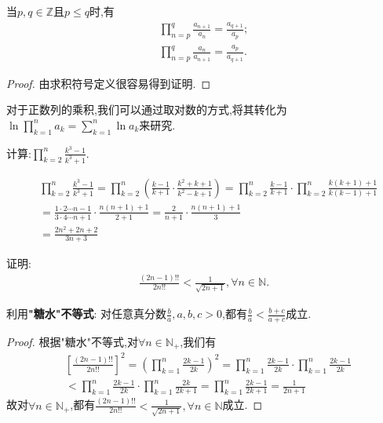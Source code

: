 \documentclass[lang=cn,newtx,10pt,scheme=chinese]{elegantbook}
\begin{document}
\begin{theorem}[基本结论]\label{theorem:求积符号基本结论}
当$p,q\in \mathbb{Z}$且$p\leq q$时,有
\begin{gather*}
\prod_{n=p}^q{\frac{a_{n+1}}{a_n}}=\frac{a_{q+1}}{a_p};
\\
\prod_{n=p}^q{\frac{a_n}{a_{n+1}}}=\frac{a_p}{a_{q+1}}.
\end{gather*}
\end{theorem}
\begin{proof}
由求积符号定义很容易得到证明.
\end{proof}
\begin{remark}
对于正数列的乘积,我们可以通过取对数的方式,将其转化为$\ln \prod_{k=1}^n{a_k}=\sum\limits_{k=1}^n{\ln a_k}$来研究.
\end{remark}
\begin{example}
计算:$\prod_{k=2}^n{\frac{k^3-1}{k^3+1}}$.
\end{example}
\begin{solution}
\begin{align*}
&\prod_{k=2}^n{\frac{k^3-1}{k^3+1}}=\prod_{k=2}^n{\left( \frac{k-1}{k+1}\cdot \frac{k^2+k+1}{k^2-k+1} \right)}=\prod_{k=2}^n{\frac{k-1}{k+1}\cdot}\prod_{k=2}^n{\frac{k\left( k+1 \right) +1}{k\left( k-1 \right) +1}}
\\
&=\frac{1\cdot 2\cdots n-1}{3\cdot 4\cdots n+1}\cdot \frac{n\left( n+1 \right) +1}{2+1}=\frac{2}{n+1}\cdot \frac{n\left( n+1 \right) +1}{3}
\\
&=\frac{2n^2+2n+2}{3n+3}
\end{align*}
\end{solution}

\begin{example}
证明:\begin{align*}
\frac{\left( 2n-1 \right) !!}{2n!!}<\frac{1}{\sqrt{2n+1}},\forall n\in \mathbb{N} .
\end{align*}
\end{example}
\begin{note}
利用\hypertarget{"糖水"不等式}{\textbf{"糖水"不等式}}:
对任意真分数$\frac{b}{a},a,b,c>0$,都有$\frac{b}{a}<\frac{b+c}{a+c}$成立.
\end{note}
\begin{proof}
根据\hypertarget{"糖水"不等式}{"糖水"不等式},对$\forall n\in \mathbb{N}_+$,我们有
\begin{align*}
&\left[ \frac{\left( 2n-1 \right) !!}{2n!!} \right] ^2=\left( \prod_{k=1}^n{\frac{2k-1}{2k}} \right) ^2=\prod_{k=1}^n{\frac{2k-1}{2k}}\cdot \prod_{k=1}^n{\frac{2k-1}{2k}}
\\
&<\prod_{k=1}^n{\frac{2k-1}{2k}}\cdot \prod_{k=1}^n{\frac{2k}{2k+1}}=\prod_{k=1}^n{\frac{2k-1}{2k+1}}=\frac{1}{2n+1}
\end{align*}
故对$\forall n\in \mathbb{N}_+$,都有$\frac{\left( 2n-1 \right) !!}{2n!!}<\frac{1}{\sqrt{2n+1}},\forall n\in \mathbb{N}$成立.
\end{proof}
\end{document}
